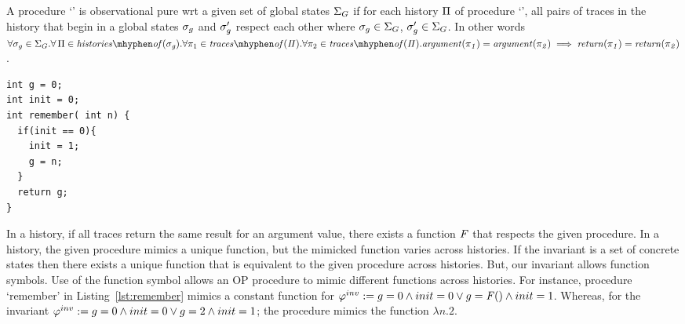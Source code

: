 \begin{definition}
  A procedure `\foo' is observational pure wrt a given set of global
  states $\Sigma_G$ if for each history $\Pi$ of procedure
  `\foo', all pairs of traces in the history that begin in a global
  states $\sigma_g$ and $\sigma_g'$ respect each other where $\sigma_g
  \in \Sigma_G$, $\sigma_g' \in \Sigma_G$.  In other words
  $\forall \gmap \in \gmaps.\forall \, \history \in
  \historyOf{\gmap}. \forall \trace_1 \in
  \tracesOf{\history}. \forall \trace_2 \in
  \tracesOf{\history}.\\ \param{\trace_1} = \param{\trace_2} \implies
  \return{\trace_1} = \return{\trace_2}$.
\end{definition}

\begin{lstlisting}[caption={Procedure `remember' : always returns the
      argument from its first call}, label=lst:remember]
int g = 0;
int init = 0;
int remember( int n) {
  if(init == 0){
    init = 1;
    g = n;
  }
  return g;
}
\end{lstlisting}

In a history, if all traces return the same result for an argument
value, there exists a function $\mathit{F}$ that respects the given
procedure. In a history, the given procedure mimics a unique function,
but the mimicked function varies across histories. If the invariant is
a set of concrete states then there exists a unique function that is
equivalent to the given procedure across histories. But, our invariant
allows function symbols. Use of the function symbol allows an OP
procedure to mimic different functions across histories. For instance,
procedure `remember' in Listing~\ref{lst:remember} mimics a constant
function for $\varphi^{inv} := g=0 \wedge init=0 \vee g= \mathit{F}() \wedge
init=1$. Whereas, for the invariant $\varphi^{inv} := g=0 \wedge init=0 \vee
g=2 \wedge init=1$; the procedure mimics the function $\lambda n.2$.
